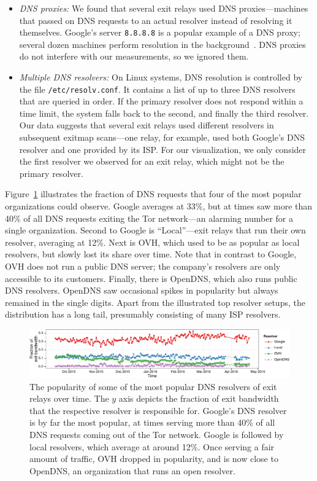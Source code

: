 \begin{itemize}
\item {\em DNS proxies:}
We found that several exit relays used DNS
proxies---machines that passed on DNS requests to an actual resolver
instead of resolving it themselves.  Google's server {\tt 8.8.8.8} is a popular
example of a DNS proxy;
several dozen machines perform resolution in the
background~\cite{google-proxies}.  DNS proxies do
not interfere with our measurements, so we ignored them.

\item {\em Multiple DNS resolvers:}
On Linux systems, DNS resolution is controlled by the file
\texttt{/etc/resolv.conf}.  It contains a list of up to three DNS resolvers
that are queried in order.  If the primary resolver does not respond within a
time limit, the system falls back to the second, and finally the third
resolver.  Our data suggests that several exit relays used
different resolvers in subsequent exitmap scans---one relay, for example, used
both Google's DNS resolver and one provided by its ISP.  For our visualization,
we only consider the first resolver we observed for an exit relay, which might
not be the primary resolver.
\end{itemize}
\noindent
Figure~\ref{fig:exit-resolvers} illustrates the fraction of DNS requests that
four of the most popular organizations could observe.  Google averages at 33\%,
but at times saw more than 40\% of all DNS requests exiting the Tor network---an
alarming number for a single organization.  Second to Google is ``Local''---exit
relays that run their own resolver, averaging at 12\%.  Next is OVH, which used
to be as popular as local resolvers, but slowly lost its share over time.  Note
that in contrast to Google, OVH does not run a public DNS server; the company's
resolvers are only accessible to its customers.  Finally, there is OpenDNS,
which also runs public DNS resolvers.  OpenDNS saw occasional spikes in
popularity but always remained in the single digits.  Apart from the illustrated
top resolver setups, the distribution has a long tail, presumably consisting of
many ISP resolvers.

\begin{figure}[t]
	\centering
	\includegraphics[width=\linewidth]{figures/asn-bw-frac.pdf}
	\caption{The popularity of some of the most popular DNS resolvers of exit
		relays over time.  The $y$ axis depicts the fraction of exit bandwidth
		that the respective resolver is responsible for.  Google's DNS resolver
		is by far the most popular, at times serving more than 40\% of all DNS
		requests coming out of the Tor network.  Google is followed by local
		resolvers, which average at around 12\%.  Once serving a fair amount of
		traffic, OVH dropped in popularity, and is now close to OpenDNS, an
		organization that runs an open resolver.}
	\label{fig:exit-resolvers}
\end{figure}


